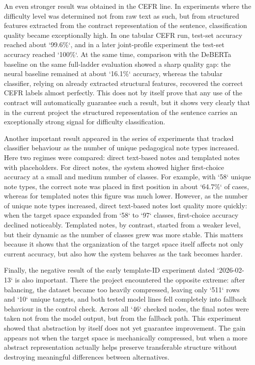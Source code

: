\documentclass[12pt,a4paper,oneside]{report}
\begin{document}
An even stronger result was obtained in the CEFR line. In experiments where the difficulty level was determined not from raw text as such, but from structured features extracted from the contract representation of the sentence, classification quality became exceptionally high. In one tabular CEFR run, test-set accuracy reached about `99.6\%`, and in a later joint-profile experiment the test-set accuracy reached `100\%`. At the same time, comparison with the DeBERTa baseline on the same full-ladder evaluation showed a sharp quality gap: the neural baseline remained at about `16.1\%` accuracy, whereas the tabular classifier, relying on already extracted structural features, recovered the correct CEFR labels almost perfectly. This does not by itself prove that any use of the contract will automatically guarantee such a result, but it shows very clearly that in the current project the structured representation of the sentence carries an exceptionally strong signal for difficulty classification.

Another important result appeared in the series of experiments that tracked classifier behaviour as the number of unique pedagogical note types increased. Here two regimes were compared: direct text-based notes and templated notes with placeholders. For direct notes, the system showed higher first-choice accuracy at a small and medium number of classes. For example, with `58` unique note types, the correct note was placed in first position in about `64.7\%` of cases, whereas for templated notes this figure was much lower. However, as the number of unique note types increased, direct text-based notes lost quality more quickly: when the target space expanded from `58` to `97` classes, first-choice accuracy declined noticeably. Templated notes, by contrast, started from a weaker level, but their dynamic as the number of classes grew was more stable. This matters because it shows that the organization of the target space itself affects not only current accuracy, but also how the system behaves as the task becomes harder.

Finally, the negative result of the early template-ID experiment dated `2026-02-13` is also important. There the project encountered the opposite extreme: after balancing, the dataset became too heavily compressed, leaving only `511` rows and `10` unique targets, and both tested model lines fell completely into fallback behaviour in the control check. Across all `46` checked nodes, the final notes were taken not from the model output, but from the fallback path. This experiment showed that abstraction by itself does not yet guarantee improvement. The gain appears not when the target space is mechanically compressed, but when a more abstract representation actually helps preserve transferable structure without destroying meaningful differences between alternatives.
\end{document}
